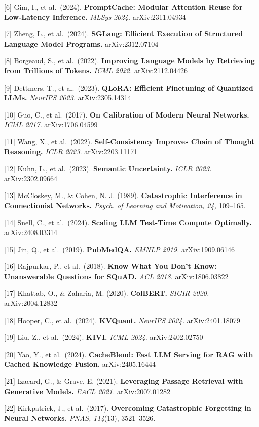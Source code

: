 \documentclass[10pt,twocolumn]{article}
\begin{document}
{[}6{]} Gim, I., et al.~(2024). \textbf{PromptCache: Modular Attention Reuse for Low-Latency Inference.} \emph{MLSys 2024.} arXiv:2311.04934

{[}7{]} Zheng, L., et al.~(2024). \textbf{SGLang: Efficient Execution of Structured Language Model Programs.} arXiv:2312.07104

{[}8{]} Borgeaud, S., et al.~(2022). \textbf{Improving Language Models by Retrieving from Trillions of Tokens.} \emph{ICML 2022.} arXiv:2112.04426

{[}9{]} Dettmers, T., et al.~(2023). \textbf{QLoRA: Efficient Finetuning of Quantized LLMs.} \emph{NeurIPS 2023.} arXiv:2305.14314

{[}10{]} Guo, C., et al.~(2017). \textbf{On Calibration of Modern Neural Networks.} \emph{ICML 2017.} arXiv:1706.04599

{[}11{]} Wang, X., et al.~(2022). \textbf{Self-Consistency Improves Chain of Thought Reasoning.} \emph{ICLR 2023.} arXiv:2203.11171

{[}12{]} Kuhn, L., et al.~(2023). \textbf{Semantic Uncertainty.} \emph{ICLR 2023.} arXiv:2302.09664

{[}13{]} McCloskey, M., \& Cohen, N. J. (1989). \textbf{Catastrophic Interference in Connectionist Networks.} \emph{Psych. of Learning and Motivation, 24,} 109--165.

{[}14{]} Snell, C., et al.~(2024). \textbf{Scaling LLM Test-Time Compute Optimally.} arXiv:2408.03314

{[}15{]} Jin, Q., et al.~(2019). \textbf{PubMedQA.} \emph{EMNLP 2019.} arXiv:1909.06146

{[}16{]} Rajpurkar, P., et al.~(2018). \textbf{Know What You Don't Know: Unanswerable Questions for SQuAD.} \emph{ACL 2018.} arXiv:1806.03822

{[}17{]} Khattab, O., \& Zaharia, M. (2020). \textbf{ColBERT.} \emph{SIGIR 2020.} arXiv:2004.12832

{[}18{]} Hooper, C., et al.~(2024). \textbf{KVQuant.} \emph{NeurIPS 2024.} arXiv:2401.18079

{[}19{]} Liu, Z., et al.~(2024). \textbf{KIVI.} \emph{ICML 2024.} arXiv:2402.02750

{[}20{]} Yao, Y., et al.~(2024). \textbf{CacheBlend: Fast LLM Serving for RAG with Cached Knowledge Fusion.} arXiv:2405.16444

{[}21{]} Izacard, G., \& Grave, E. (2021). \textbf{Leveraging Passage Retrieval with Generative Models.} \emph{EACL 2021.} arXiv:2007.01282

{[}22{]} Kirkpatrick, J., et al.~(2017). \textbf{Overcoming Catastrophic Forgetting in Neural Networks.} \emph{PNAS, 114}(13), 3521--3526.
\end{document}
